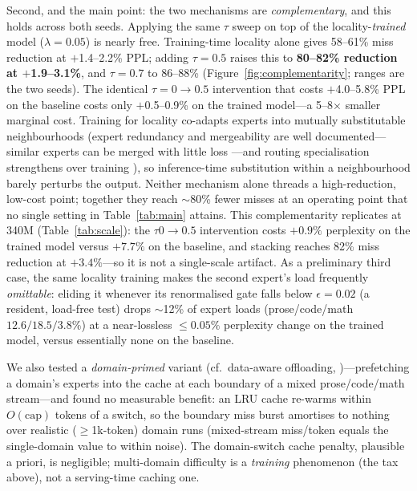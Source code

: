 \documentclass[11pt]{article}
\begin{document}
Second, and the main point: the two mechanisms are \emph{complementary}, and this
holds across both seeds. Applying the same $\tau$ sweep on top of the
locality-\emph{trained} model ($\lambda{=}0.05$) is nearly free. Training-time
locality alone gives 58--61\% miss reduction at $+$1.4--2.2\% PPL; adding
$\tau{=}0.5$ raises this to \textbf{80--82\% reduction at $+$1.9--3.1\%}, and
$\tau{=}0.7$ to 86--88\% (Figure~\ref{fig:complementarity}; ranges are the two
seeds). The identical $\tau{=}0{\to}0.5$ intervention that costs $+$4.0--5.8\% PPL
on the baseline costs only $+$0.5--0.9\% on the trained model---a 5--8$\times$
smaller marginal cost. Training for locality co-adapts experts into mutually
substitutable neighbourhoods (expert redundancy and mergeability are well
documented---similar experts can be merged with little loss \citep{li2024mcsmoe}---and
routing specialisation strengthens over training \citep{mouzouni2026threephases}),
so inference-time substitution within a
neighbourhood barely perturbs the output. Neither mechanism alone threads a
high-reduction, low-cost point; together they reach $\sim$80\% fewer misses at an
operating point that no single setting in Table~\ref{tab:main} attains. This
complementarity replicates at 340M (Table~\ref{tab:scale}): the $\tau0{\to}0.5$
intervention costs $+0.9\%$ perplexity on the trained model versus $+7.7\%$ on the
baseline, and stacking reaches 82\% miss reduction at $+3.4\%$---so it is not a
single-scale artifact. As a preliminary third case, the same locality training makes
the second expert's load frequently \emph{omittable}: eliding it whenever its
renormalised gate falls below $\epsilon{=}0.02$ (a resident, load-free test) drops
$\sim$12\% of expert loads (prose/code/math $12.6/18.5/3.8\%$) at a near-lossless
${\le}0.05\%$ perplexity change on the trained model, versus essentially none on the
baseline.

We also tested a \emph{domain-primed} variant (cf.\ data-aware offloading,
\citealp{zhang2025daop})---prefetching a domain's experts
into the cache at each boundary of a mixed prose/code/math stream---and found no
measurable benefit: an LRU cache re-warms within $O(\text{cap})$ tokens of a
switch, so the boundary miss burst amortises to nothing over realistic
($\ge$1k-token) domain runs (mixed-stream miss/token equals the single-domain
value to within noise). The domain-switch cache penalty, plausible a priori, is
negligible; multi-domain difficulty is a \emph{training} phenomenon (the tax
above), not a serving-time caching one.
\end{document}
